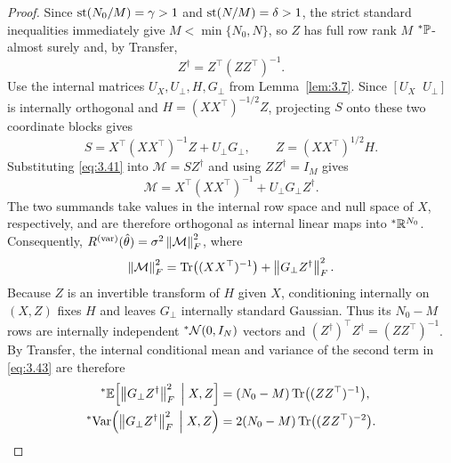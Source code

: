 \begin{proof}
Since $\operatorname{st}(N_0 / M) = \gamma > 1$ and $\operatorname{st}(N / M) = \delta > 1$, the strict standard inequalities immediately give $M < \min\{N_0, N\}$, so $Z$ has full row rank $M$ ${}^*\mathbb{P}$-almost surely and, by Transfer,
\begin{equation}\label{eq:3.40}
Z^\dagger = Z^\top (Z Z^\top)^{-1}.
\end{equation}
Use the internal matrices $U_X, U_\perp, H, G_\perp$ from Lemma~\ref{lem:3.7}. Since $[U_X \;\; U_\perp]$ is internally orthogonal and $H = (X X^\top)^{-1/2}Z$, projecting $S$ onto these two coordinate blocks gives
\begin{equation}\label{eq:3.41}
S = X^\top (X X^\top)^{-1} Z + U_\perp G_\perp, \qquad Z = (X X^\top)^{1/2} H.
\end{equation}
Substituting \eqref{eq:3.41} into $\mathcal{M} = S Z^\dagger$ and using $Z Z^\dagger = I_M$ gives
\begin{equation}\label{eq:3.42}
\mathcal{M} = X^\top (X X^\top)^{-1} + U_\perp G_\perp Z^\dagger.
\end{equation}
The two summands take values in the internal row space and null space of $X$, respectively, and are therefore orthogonal as internal linear maps into ${}^*\mathbb{R}^{N_0}$. Consequently, $R^{(\mathrm{var})}(\hat{\theta}) = \sigma^2 \left\lVert \mathcal{M} \right\rVert_F^2$, where
\begin{equation}\label{eq:3.43}
\left\lVert \mathcal{M} \right\rVert_F^2 = \operatorname{Tr}\bigl((X X^\top)^{-1}\bigr) + \left\lVert G_\perp Z^\dagger \right\rVert_F^2.
\end{equation}
Because $Z$ is an invertible transform of $H$ given $X$, conditioning internally on $(X, Z)$ fixes $H$ and leaves $G_\perp$ internally standard Gaussian. Thus its $N_0 - M$ rows are internally independent ${}^*\mathcal{N}(0, I_N)$ vectors and $(Z^\dagger)^\top Z^\dagger = (Z Z^\top)^{-1}$. By Transfer, the internal conditional mean and variance of the second term in \eqref{eq:3.43} are therefore
\begin{equation}\label{eq:3.44}
\begin{aligned}
{}^*\mathbb{E}\Bigl[\left\lVert G_\perp Z^\dagger \right\rVert_F^2 \;\Big|\; X, Z\Bigr] &= (N_0 - M)\operatorname{Tr}\bigl((Z Z^\top)^{-1}\bigr), \\
{}^*\!\operatorname{Var}\Bigl(\left\lVert G_\perp Z^\dagger \right\rVert_F^2 \;\Big|\; X, Z\Bigr) &= 2(N_0 - M)\operatorname{Tr}\bigl((Z Z^\top)^{-2}\bigr).
\end{aligned}
\end{equation}


\end{proof}
